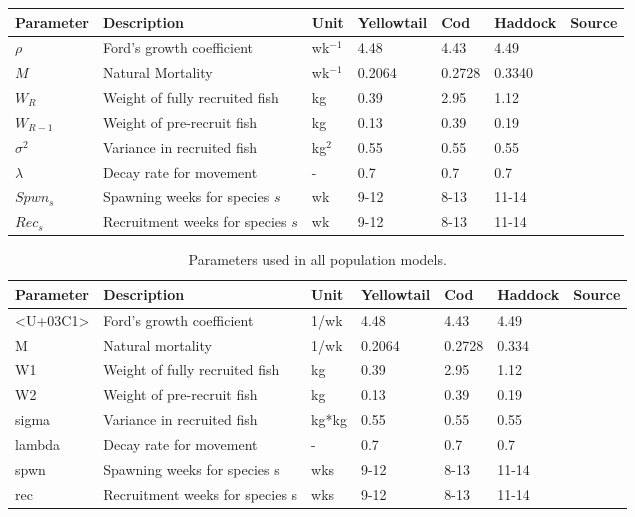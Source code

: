\documentclass[
  12pt,
]{article}
\begin{document}
\begin{longtable}[]{@{}lllllll@{}}
\toprule
Parameter & Description & Unit & Yellowtail & Cod & Haddock & Source \\
\midrule
\endhead
\(\rho\) & Ford's growth coefficient & wk\(^{-1}\) & 4.48 & 4.43 & 4.49 & \\
\(M\) & Natural Mortality & wk\(^{-1}\) & 0.2064 & 0.2728 & 0.3340 & \\
\(W_R\) & Weight of fully recruited fish & kg & 0.39 & 2.95 & 1.12 & \\
\(W_{R-1}\) & Weight of pre-recruit fish & kg & 0.13 & 0.39 & 0.19 & \\
\(\sigma^2\) & Variance in recruited fish & kg\(^2\) & 0.55 & 0.55 & 0.55 & \\
\(\lambda\) & Decay rate for movement & - & 0.7 & 0.7 & 0.7 & \\
\(Spwn_s\) & Spawning weeks for species \(s\) & wk & 9-12 & 8-13 & 11-14 & \\
\(Rec_s\) & Recruitment weeks for species \(s\) & wk & 9-12 & 8-13 & 11-14 & \\
\bottomrule
\end{longtable}

\begin{table}
 
 \caption{\label{tab:paramsALL2}Parameters used in all population models.}
 \centering
 \fontsize{10}{12}\selectfont
 \begin{tabular}[t]{lllllll}
 \toprule
 Parameter & Description & Unit & Yellowtail & Cod & Haddock & Source\\
 \midrule
 <U+03C1> & Ford's growth coefficient & 1/wk & 4.48 & 4.43 & 4.49 & \\
 M & Natural mortality & 1/wk & 0.2064 & 0.2728 & 0.334 & \\
 W1 & Weight of fully recruited fish & kg & 0.39 & 2.95 & 1.12 & \\
 W2 & Weight of pre-recruit fish & kg & 0.13 & 0.39 & 0.19 & \\
 sigma & Variance in recruited fish & kg*kg & 0.55 & 0.55 & 0.55 & \\
 \addlinespace
 lambda & Decay rate for movement & - & 0.7 & 0.7 & 0.7 & \\
 spwn & Spawning weeks for species s & wks & 9-12 & 8-13 & 11-14 & \\
 rec & Recruitment weeks for species s & wks & 9-12 & 8-13 & 11-14 & \\
 \bottomrule
 \end{tabular}
 \end{table}
\end{document}
